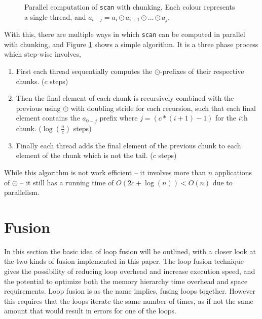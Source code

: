 \documentclass[11pt]{article}
\begin{document}
\begin{figure}[h!]
  
  \caption{Parallel computation of \texttt{scan} with chunking. Each colour represents a single thread, and $a_{i-j} = a_i \odot a_{i+1} \odot ... \odot a_j$.}
  \label{fig:scancomp1}
\end{figure}
With this, there are multiple ways in which \texttt{scan} can be computed in parallel with chunking, and Figure \ref{fig:scancomp1} shows a simple algorithm.
 It is a three phase process which step-wise involves,
 \begin{enumerate}
 \item First each thread sequentially computes the $\odot$-prefixes of their respective chunks. ($c$ steps)
 \item Then the final element of each chunk is recursively combined with the previous using $\odot$ with
 doubling stride for each recursion, such that each final element contains the $a_{0-j}$ prefix where $j = (c * (i+1) - 1)$ for the
 $i$th chunk. ($\log(\frac{n}{c})$ steps)
 \item Finally each thread adds the final element of the previous chunk to each element of the chunk
 which is not the tail. ($c$ steps)
 \end{enumerate}
While this algorithm is not work efficient -- it involves more than $n$ applications of $\odot$ -- it still has a running time of $O(2c + \log(n)) < O(n)$ due to parallelism.

\section{Fusion}
In this section the basic idea of loop fusion will be outlined, with a closer look at the two kinds of fusion implemented in this paper.
The loop fusion technique gives the possibility of reducing loop overhead and increase execution speed, and the potential to optimize both the memory hierarchy time overhead and space requirements. Loop fusion is as the name implies, fusing loops together. However this requires that the loops iterate the same number of times, as if not the same amount that would result in errors for one of the loops.
\end{document}
